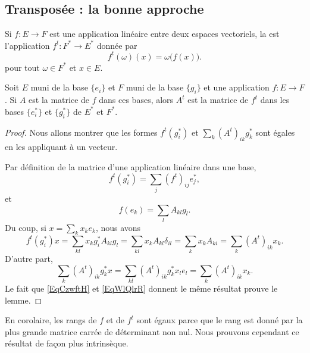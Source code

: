 \subsection{Transposée : la bonne approche}

\begin{definition}      \label{DefooZLPAooKTITdd}
    Si \( f\colon E\to F\) est une application linéaire entre deux espaces vectoriels, la  est l'application \( f^t\colon F^*\to E^*\) donnée par
    \begin{equation}
        f^t(\omega)(x)=\omega\big( f(x) \big).
    \end{equation}
    pour tout \( \omega\in F^*\) et \( x\in E\).
\end{definition}

\begin{lemma}
    Soit \( E\) muni de la base \( \{ e_i \}\) et \( F\) muni de la base \( \{ g_i \}\) et une application \( f\colon E\to F\). Si \( A\) est la matrice de \( f\) dans ces bases, alors \( A^t\) est la matrice de \( f^t\) dans les bases \( \{ e^*_i \}\) et \( \{ g^*_i \}\) de \( E^*\) et \( F^*\).
\end{lemma}

\begin{proof}
    Nous allons montrer que les formes \( f^t(g^*_i)\) et \( \sum_k(A^t)_{ik}g^*_k\) sont égales en les appliquant à un vecteur.

    Par définition de la matrice d'une application linéaire dans une base,
    \begin{equation}
        f^t(g_i^*)=\sum_j(f^t)_{ij}e^*_j,
    \end{equation}
    et
    \begin{equation}
        f(e_k)=\sum_lA_{kl}g_l.
    \end{equation}
    Du coup, si \( x=\sum_kx_ke_k\), nous avons
    \begin{equation}    \label{EqCzwftH}
        f^t(g_i^*)x=\sum_{kl}x_kg_i^*A_{kl}g_l=\sum_{kl}x_kA_{kl}\delta_{il}=\sum_k x_kA_{ki}=\sum_k(A^t)_{ik}x_k.
    \end{equation}
    D'autre part,
    \begin{equation}    \label{EqWlQlrR}
        \sum_k(A^t)_{ik}g_k^*x=\sum_{kl}(A^t)_{ik}g^*_kx_le_l=\sum_k(A^t)_{ik}x_k.
    \end{equation}
    Le fait que \eqref{EqCzwftH} et \eqref{EqWlQlrR} donnent le même résultat prouve le lemme.
\end{proof}
En corolaire, les rangs de \( f\) et de \( f^t\) sont égaux parce que le rang est donné par la plus grande matrice carrée de déterminant non nul. Nous prouvons cependant ce résultat de façon plus intrinsèque.

